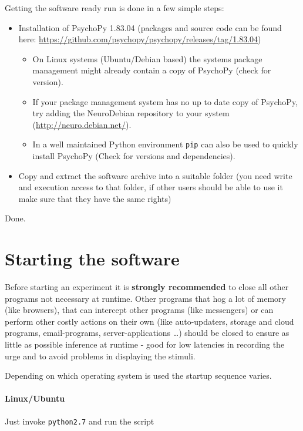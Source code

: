\documentclass[12pt,a4paper]{book}
\begin{document}
Getting the software ready run is done in a few simple steps:

\begin{itemize}
	\item Installation of PsychoPy 1.83.04 (packages and source code can be found here: \url{https://github.com/psychopy/psychopy/releases/tag/1.83.04})
	\begin{itemize}
		\item On Linux systems (Ubuntu/Debian based) the systems package management  might already contain a copy of PsychoPy (check for version).
		\item If your package management system has no up to date copy of PsychoPy, try adding the NeuroDebian repository to your system (\url{http://neuro.debian.net/}).
		\item In a well maintained Python environment \verb|pip| can also be used to quickly install PsychoPy (Check for versions and dependencies).
	\end{itemize}
	\item Copy and extract the software archive into a suitable folder (you need write and execution access to that folder, if other users should be able to use it make sure that they have the same rights)
\end{itemize} 

Done.

\section{Starting the software}

Before starting an experiment it is \textbf{strongly recommended} to close all other programs not necessary at runtime. Other programs that hog a lot of memory (like browsers), that can intercept other programs (like messengers) or can perform other costly actions on their own (like auto-updaters, storage and cloud programs, email-programs, server-applications \dots) should be closed to ensure as little as possible inference at runtime - good for low latencies in recording the urge and to avoid problems in displaying the stimuli.

Depending on which operating system is used the startup sequence varies.

\paragraph{Linux/Ubuntu}

Just invoke \verb|python2.7| and run the script 
\end{document}
